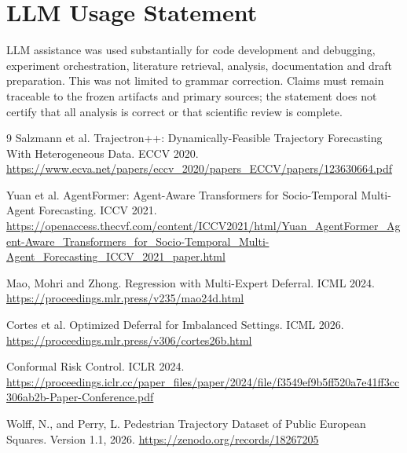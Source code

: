 \documentclass[10pt,twocolumn,letterpaper]{article}
\begin{document}
\clearpage
{}
\section*{LLM Usage Statement}
LLM assistance was used substantially for code development and debugging,
experiment orchestration, literature retrieval, analysis, documentation and
draft preparation. This was not limited to grammar correction. Claims must
remain traceable to the frozen artifacts and primary sources; the statement
does not certify that all analysis is correct or that scientific review is complete.

\begin{thebibliography}{9}
 Salzmann et al. Trajectron++: Dynamically-Feasible Trajectory Forecasting With
Heterogeneous Data. ECCV 2020. \url{https://www.ecva.net/papers/eccv_2020/papers_ECCV/papers/123630664.pdf}


 Yuan et al. AgentFormer: Agent-Aware Transformers for Socio-Temporal Multi-Agent
Forecasting. ICCV 2021. \url{https://openaccess.thecvf.com/content/ICCV2021/html/Yuan_AgentFormer_Agent-Aware_Transformers_for_Socio-Temporal_Multi-Agent_Forecasting_ICCV_2021_paper.html}


 Mao, Mohri and Zhong. Regression with Multi-Expert Deferral. ICML 2024.
\url{https://proceedings.mlr.press/v235/mao24d.html}


 Cortes et al. Optimized Deferral for Imbalanced Settings. ICML 2026.
\url{https://proceedings.mlr.press/v306/cortes26b.html}


 Conformal Risk Control. ICLR 2024.
\url{https://proceedings.iclr.cc/paper_files/paper/2024/file/f3549ef9b5ff520a7e41ff3cc306ab2b-Paper-Conference.pdf}


 Wolff, N., and Perry, L. Pedestrian Trajectory Dataset of Public European Squares.
Version 1.1, 2026. \url{https://zenodo.org/records/18267205}


\end{thebibliography}
\end{document}
